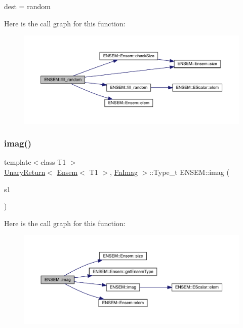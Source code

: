 dest = random 

Here is the call graph for this function\+:\nopagebreak
\begin{figure}[H]
\begin{center}
\leavevmode
\includegraphics[width=350pt]{d1/d9e/group__eensem_gaa016282cc53ea94b4fc28c2714c30294_cgraph}
\end{center}
\end{figure}
\mbox{\label{group__eensem_gab3382717c5ea66ead42fa648ad4cefbc}} 
\subsubsection{\texorpdfstring{imag()}{imag()}}
{\footnotesize\ttfamily template$<$class T1 $>$ \\
\mbox{\hyperlink{structENSEM_1_1UnaryReturn}{Unary\+Return}}$<$ \mbox{\hyperlink{classENSEM_1_1Ensem}{Ensem}}$<$ T1 $>$, \mbox{\hyperlink{structENSEM_1_1FnImag}{Fn\+Imag}} $>$\+::Type\+\_\+t E\+N\+S\+E\+M\+::imag (\begin{DoxyParamCaption}\item[{const \mbox{\hyperlink{classENSEM_1_1Ensem}{Ensem}}$<$ T1 $>$ \&}]{s1 }\end{DoxyParamCaption})\hspace{0.3cm}{\ttfamily [inline]}}

Here is the call graph for this function\+:\nopagebreak
\begin{figure}[H]
\begin{center}
\leavevmode
\includegraphics[width=350pt]{d1/d9e/group__eensem_gab3382717c5ea66ead42fa648ad4cefbc_cgraph}
\end{center}
\end{figure}
\mbox{\label{group__eensem_ga13016a14218fbe75f26f9acd37e1efe5}} 
